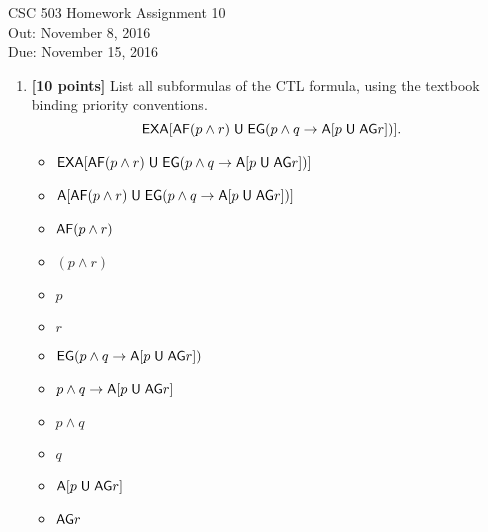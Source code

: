 \documentclass{article}
\begin{document}
\begin{center}
  {\LARGE CSC 503 Homework Assignment 10}\\[1pc]
  Out: November 8, 2016 \\
  Due: November 15, 2016 \\
\end{center}

\begin{enumerate}

\item \textbf{[10 points]} List all subformulas of the CTL formula,
  using the textbook binding priority conventions.
  \begin{displaymath}
    \Exists \NextX \All [ \All \Sometime (p \land r)
    \Until \Exists \Forever (p \land q \implies
    \All [p \Until \All \Forever r])].
  \end{displaymath}
  
 \begin{answer}
  \begin{itemize}

  
    \item $\Exists \NextX \All [ \All \Sometime (p \land r)
    \Until \Exists \Forever (p \land q \implies
    \All [p \Until \All \Forever r])]$
    \item $\All [ \All \Sometime (p \land r)
    \Until \Exists \Forever (p \land q \implies
    \All [p \Until \All \Forever r])]$
    \item $\All \Sometime (p \land r)$
    \item $(p \land r)$
    \item $p$
    \item $r$
    \item $\Exists \Forever (p \land q \implies
    \All [p \Until \All \Forever r])$
    \item $p \land q \implies
    \All [p \Until \All \Forever r]$
    \item $p \land q$
    \item $q$
    \item $\All [p \Until \All \Forever r]$
    \item $\All \Forever r$
    
  \end{itemize} 
 \end{answer}
 

\end{enumerate}
\end{document}
